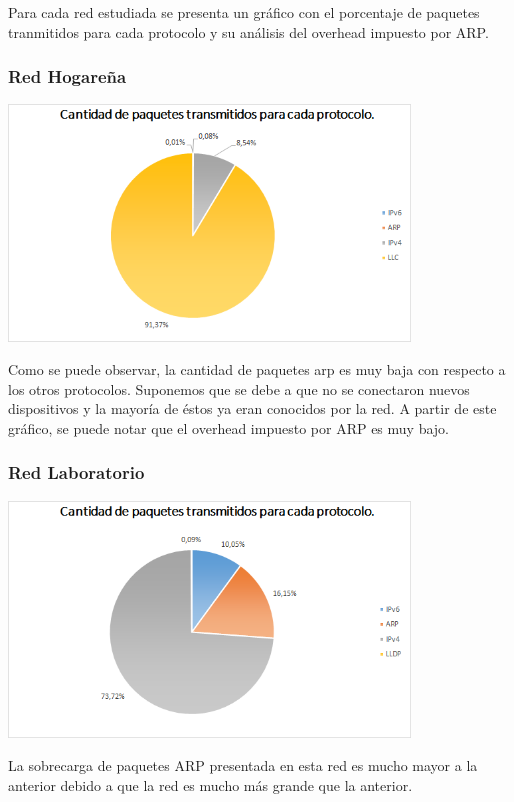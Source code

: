 Para cada red estudiada se presenta un gráfico con el porcentaje de paquetes tranmitidos para cada protocolo y su análisis del overhead impuesto por ARP.

\subsubsection{Red Hogareña}

\centerline{\includegraphics[width=0.8\textwidth]{./graficos/paquetesVSProtocolo/casa_mari2.png}}

Como se puede observar, la cantidad de paquetes arp es muy baja con respecto a los otros protocolos. Suponemos que se debe a que no se conectaron nuevos dispositivos y la mayoría de éstos ya eran conocidos por la red. A partir de este gráfico, se puede notar que el overhead impuesto por ARP es muy bajo.

\subsubsection{Red Laboratorio}

\centerline{\includegraphics[width=0.8\textwidth]{./graficos/paquetesVSProtocolo/labo52.png}}
	
La sobrecarga de paquetes ARP presentada en esta red es mucho mayor a la anterior debido a que la red es mucho más grande que la anterior.

